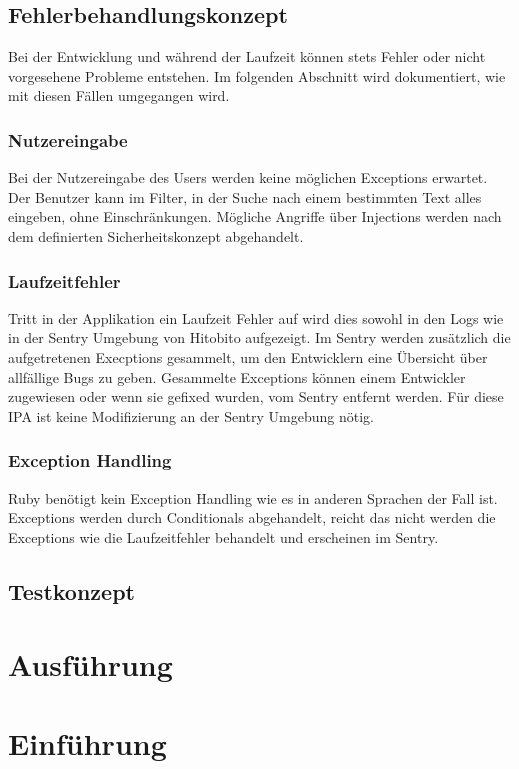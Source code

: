 \section{Fehlerbehandlungskonzept}
Bei der Entwicklung und während der Laufzeit können stets Fehler oder nicht vorgesehene Probleme entstehen.
Im folgenden Abschnitt wird dokumentiert, wie mit diesen Fällen umgegangen wird.

\subsection{Nutzereingabe}
Bei der Nutzereingabe des Users werden keine möglichen Exceptions erwartet. Der Benutzer kann im Filter, in der Suche nach einem
bestimmten Text alles eingeben, ohne Einschränkungen. Mögliche Angriffe über Injections werden nach dem definierten
Sicherheitskonzept abgehandelt.

\subsection{Laufzeitfehler}
Tritt in der Applikation ein Laufzeit Fehler auf wird dies sowohl in den Logs wie in der Sentry
Umgebung von Hitobito aufgezeigt. Im Sentry werden zusätzlich die aufgetretenen Execptions gesammelt, um 
den Entwicklern eine Übersicht über allfällige Bugs zu geben. Gesammelte Exceptions können einem Entwickler
zugewiesen oder wenn sie gefixed wurden, vom Sentry entfernt werden. Für diese IPA ist keine Modifizierung an der 
Sentry Umgebung nötig.

\subsection{Exception Handling}
Ruby benötigt kein Exception Handling wie es in anderen Sprachen der Fall ist. Exceptions werden durch Conditionals
abgehandelt, reicht das nicht werden die Exceptions wie die Laufzeitfehler behandelt und erscheinen im Sentry.

\section{Testkonzept}

\chapter{Ausführung}



\chapter{Einführung}

